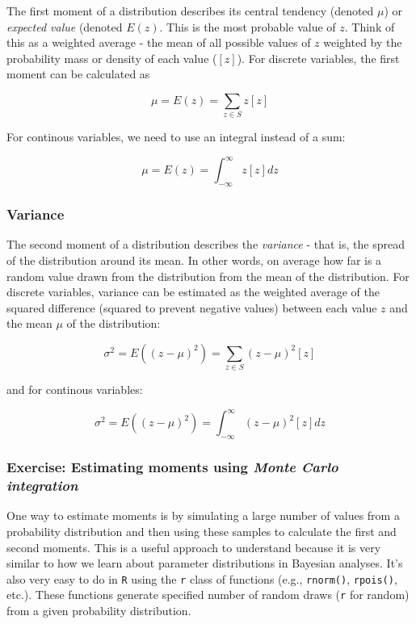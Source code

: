 \documentclass[]{article}
\begin{document}
The first moment of a distribution describes its central tendency
(denoted \(\mu\)) or \emph{expected value} (denoted \(E(z)\). This is
the most probable value of \(z\). Think of this as a weighted average -
the mean of all possible values of \(z\) weighted by the probability
mass or density of each value (\([z]\)). For discrete variables, the
first moment can be calculated as

\[\mu = E(z) = \sum_{z \in S} z[z]\]

For continous variables, we need to use an integral instead of a sum:

\[\mu = E(z) = \int_{-\infty}^{\infty} z[z]dz\]

\hypertarget{variance}{%
\subsubsection{Variance}\label{variance}}

The second moment of a distribution describes the \emph{variance} - that
is, the spread of the distribution around its mean. In other words, on
average how far is a random value drawn from the distribution from the
mean of the distribution. For discrete variables, variance can be
estimated as the weighted average of the squared difference (squared to
prevent negative values) between each value \(z\) and the mean \(\mu\)
of the distribution:

\[\sigma^2 = E((z - \mu)^2) = \sum_{z \in S} (z - \mu)^2[z]\]

and for continous variables:

\[\sigma^2 = E((z - \mu)^2) = \int_{-\infty}^{\infty} (z - \mu)^2[z]dz\]

\hypertarget{exercise-estimating-moments-using-monte-carlo-integration}{%
\subsubsection{\texorpdfstring{Exercise: Estimating moments using
\emph{Monte Carlo
integration}}{Exercise: Estimating moments using Monte Carlo integration}}\label{exercise-estimating-moments-using-monte-carlo-integration}}

One way to estimate moments is by simulating a large number of values
from a probability distribution and then using these samples to
calculate the first and second moments. This is a useful approach to
understand because it is very similar to how we learn about parameter
distributions in Bayesian analyses. It's also very easy to do in
\texttt{R} using the \texttt{r} class of functions (e.g.,
\texttt{rnorm()}, \texttt{rpois()}, etc.). These functions generate
specified number of random draws (\texttt{r} for random) from a given
probability distribution.
\end{document}
